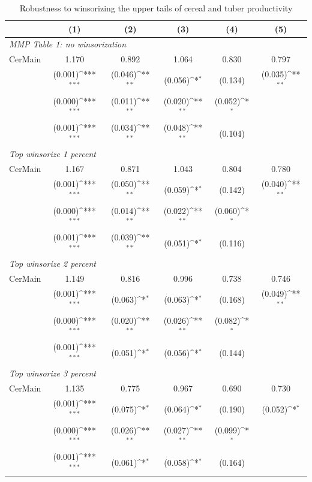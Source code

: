 \documentclass[11pt]{article}
\begin{document}
\bigskip
\renewcommand{\thetable}{R\arabic{table}}

\begin{table}[htbp]\centering
\footnotesize
\def\sym#1{\ifmmode^{#1}\else\(^{#1}\)\fi}
\caption{Robustness to winsorizing the upper tails of cereal and tuber productivity}
\label{tab:main}
\begin{tabular}{l*{5}{c}}
\hline\hline
&\multicolumn{1}{c}{(1)}&\multicolumn{1}{c}{(2)}&\multicolumn{1}{c}{(3)}&\multicolumn{1}{c}{(4)}&\multicolumn{1}{c}{(5)}\\
\hline
\multicolumn{6}{l}{\textit{MMP Table 1: no winsorization}}\\
CerMain  &    1.170  &    0.892  &    1.064  &    0.830  &    0.797  \\
         &  (0.001)\sym{***}&  (0.046)\sym{**} &  (0.056)\sym{*}  &  (0.134)  &  (0.035)\sym{**} \\
         &  (0.000)\sym{***} & (0.011)\sym{**} & (0.020)\sym{**}  & (0.052)\sym{*} & \\
         &  (0.001)\sym{***} & (0.034)\sym{**} & (0.048)\sym{**} & (0.104) & \\
\hline
\multicolumn{6}{l}{\textit{Top winsorize 1 percent}}\\
CerMain  &    1.167  &    0.871  &    1.043  &    0.804  &    0.780  \\
         &  (0.001)\sym{***}&  (0.050)\sym{**} &  (0.059)\sym{*}  &  (0.142)  &  (0.040)\sym{**} \\
         &  (0.000)\sym{***} & (0.014)\sym{**} & (0.022)\sym{**} & (0.060)\sym{*} & \\
         &  (0.001)\sym{***} & (0.039)\sym{**} & (0.051)\sym{*} & (0.116) & \\
\hline
\multicolumn{6}{l}{\textit{Top winsorize 2 percent}}\\
CerMain  &    1.149  &    0.816  &    0.996  &    0.738  &    0.746  \\
         &  (0.001)\sym{***}&  (0.063)\sym{*}  &  (0.063)\sym{*}  &  (0.168)  &  (0.049)\sym{**} \\
         &  (0.000)\sym{***} & (0.020)\sym{**} & (0.026)\sym{**} & (0.082)\sym{*} & \\
         &  (0.001)\sym{***} & (0.051)\sym{*}  & (0.056)\sym{*}  & (0.144) & \\

\hline
\multicolumn{6}{l}{\textit{Top winsorize 3 percent}}\\

CerMain         &    1.135         &    0.775         &    0.967         &    0.690         &    0.730         \\
&  (0.001)\sym{***}&  (0.075)\sym{*}  &  (0.064)\sym{*}  &  (0.190)         &  (0.052)\sym{*}  \\
& (0.000)\sym{***} & (0.026)\sym{**} & (0.027)\sym{**}  & (0.099)\sym{*}  \\
& (0.001)\sym{***} & (0.061)\sym{*} & (0.058)\sym{*}  & (0.164) \\


\end{tabular}
\end{table}
\end{document}
